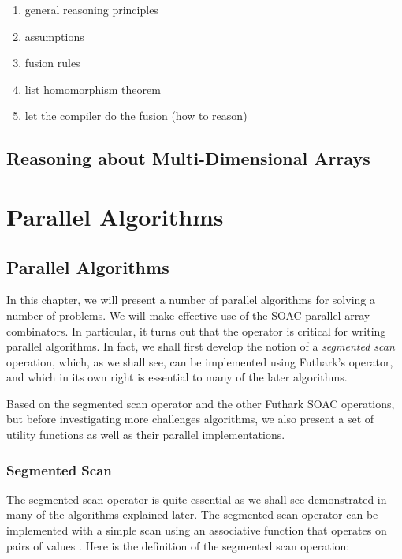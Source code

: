 \documentclass[oneside,11pt]{book}
\begin{document}
\begin{enumerate}
\item general reasoning principles
\item assumptions
\item fusion rules
\item list homomorphism theorem
\item let the compiler do the fusion (how to reason)
\end{enumerate}

\chapter{Reasoning about Multi-Dimensional Arrays}

\part{Parallel Algorithms}

\chapter{Parallel Algorithms}
\label{chap:parallel-algorithms}

In this chapter, we will present a number of parallel algorithms for
solving a number of problems. We will make effective use of the
SOAC parallel array combinators. In particular, it turns out that the
 operator is critical for writing parallel algorithms. In
fact, we shall first develop the notion of a \emph{segmented scan}
operation, which, as we shall see, can be implemented using Futhark's 
operator, and which in its own right is essential to many of the later
algorithms.

Based on the segmented scan operator and the other Futhark SOAC
operations, but before investigating more challenges algorithms, we
also present a set of utility functions as well as their parallel
implementations.

\section{Segmented Scan}
\label{sec:sgmscan}

The segmented scan operator is quite essential as we shall see
demonstrated in many of the algorithms explained later. The segmented
scan operator can be implemented with a simple scan using an
associative function that operates on pairs of values
\cite{Schwartz:1980:ULT:357114.357116,blelloch1990vector}. Here is the
definition of the segmented scan operation:
\end{document}
